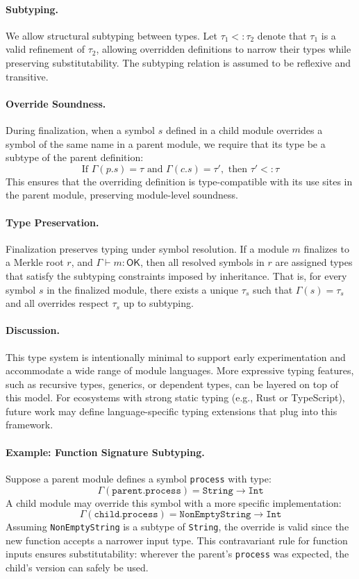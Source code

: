 \documentclass[sigplan,screen]{acmart}
\begin{document}
\paragraph{Subtyping.} We allow structural subtyping between types. Let $\tau_1 <: \tau_2$ denote that $\tau_1$ is a valid refinement of $\tau_2$, allowing overridden definitions to narrow their types while preserving substitutability. The subtyping relation is assumed to be reflexive and transitive.

\paragraph{Override Soundness.} During finalization, when a symbol $s$ defined in a child module overrides a symbol of the same name in a parent module, we require that its type be a subtype of the parent definition:
\[
\text{If } \Gamma(p.s) = \tau \text{ and } \Gamma(c.s) = \tau', \text{ then } \tau' <: \tau
\]
This ensures that the overriding definition is type-comp\-atible with its use sites in the parent module, preserving module-level soundness.

\paragraph{Type Preservation.} Finalization preserves typing under symbol resolution. If a module $m$ finalizes to a Merkle root $r$, and $\Gamma \vdash m : \mathsf{OK}$, then all resolved symbols in $r$ are assigned types that satisfy the subtyping constraints imposed by inheritance. That is, for every symbol $s$ in the finalized module, there exists a unique $\tau_s$ such that $\Gamma(s) = \tau_s$ and all overrides respect $\tau_s$ up to subtyping.

\paragraph{Discussion.} This type system is intentionally minimal to support early experimentation and accommodate a wide range of module languages. More expressive typing features, such as recursive types, generics, or dependent types, can be layered on top of this model. For ecosystems with strong static typing (e.g., Rust or TypeScript), future work may define language-specific typing extensions that plug into this framework.

\paragraph{Example: Function Signature Subtyping.}
Suppose a parent module defines a symbol \texttt{process} with type:
\[
\Gamma(\texttt{parent.process}) = \texttt{String} \rightarrow \texttt{Int}
\]
A child module may override this symbol with a more specific implementation:
\[
\Gamma(\texttt{child.process}) = \texttt{NonEmptyString} \rightarrow \texttt{Int}
\]
Assuming \texttt{NonEmptyString} is a subtype of \texttt{String}, the override is valid since the new function accepts a narrower input type. This contravariant rule for function inputs ensures substitutability: wherever the parent's \texttt{process} was expected, the child's version can safely be used.
\end{document}
